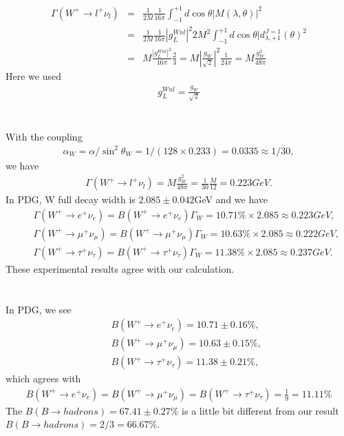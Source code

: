 \documentclass[11pt]{article}
\def\lmd{\lambda}
\begin{document}
\section{ }
\begin{eqnarray}
  \Gamma(W^+ \to l^+ \nu_l)
&=& \frac{1}{2M} \frac{1}{16\pi} \int_{-1}^{+1} d\cos\theta |M(\lambda,\theta)|^2\\
&=& \frac{1}{2M} \frac{1}{16\pi} |g_L^{Wnl}|^2 2M^2
    \int_{-1}^{+1} d\cos\theta |d^{J=1}_{\lmd,+1}(\theta)^2 \\
&=& M \frac{|g_L^{Wnl}|^2}{16\pi} \frac{2}{3} =M |\frac{g_W}{\sqrt 2}|^2 \frac{1}{24\pi} = M \frac{g_W^2}{48\pi}
\end{eqnarray}
Here we used
\begin{eqnarray}
  g_L^{Wnl}=\frac{g_W}{\sqrt 2}
\end{eqnarray}

\section{ }
With the coupling
\begin{eqnarray}
  \alpha_W = \alpha/\sin^2\theta_W
                            = 1/(128\times 0.233)
                            =0.0335\approx 1/30,
\end{eqnarray}
we have
\begin{eqnarray}
  \Gamma(W^+ \to l^+ \nu_l)
= M \frac{g_W^2}{48\pi} =\frac{1}{30}\frac{M}{12} = 0.223 GeV.
\end{eqnarray}
In PDG, W full decay width is $2.085\pm 0.042$GeV and we have
\begin{eqnarray}
  &&\Gamma(W^+ \to e^+ \nu_e)=B (W^+ \to e^+ \nu_e) \Gamma_W= 10.71\% \times 2.085 \approx 0.223 GeV, \\
  &&\Gamma(W^+ \to \mu^+ \nu_\mu)= B (W^+ \to \mu^+ \nu_\mu) \Gamma_W= 10.63\% \times 2.085 \approx 0.222 GeV, \\ 
  &&\Gamma(W^+ \to \tau^+ \nu_\tau) =B(W^+ \to \tau^+ \nu_\tau)\Gamma_W= 11.38\% \times 2.085 \approx 0.237 GeV.
\end{eqnarray}
These experimental results agree with our calculation.

\section{ }
In PDG, we see
\begin{eqnarray}
  &&B (W^+ \to e^+ \nu_e) = 10.71\pm0.16\%,\\ &&B (W^+ \to \mu^+ \nu_\mu) = 10.63\pm0.15\%,\\&&B(W^+ \to \tau^+ \nu_\tau)= 11.38\pm0.21\%,
\end{eqnarray}
which agrees with
\begin{eqnarray}
  B(W^+ \to e^+ \nu_e) = B(W^+ \to \mu^+ \nu_\mu)
                        = B(W^+ \to \tau^+ \nu_\tau) = \frac{1}{9} = 11.11\%
\end{eqnarray}
The $B(B\to hadrons)= 67.41\pm 0.27\%$ is a little bit different from our result $B(B\to hadrons)= 2/3=66.67\%$.
\end{document}
